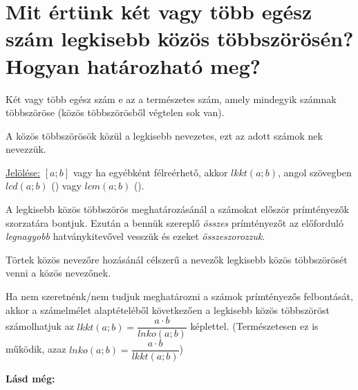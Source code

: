 
\section{Mit értünk két vagy több egész szám legkisebb közös többszörösén?
\texorpdfstring{\\}{}Hogyan határozható meg?}
\label{002}

\begin{defin}
Két vagy több egész szám e az a természetes szám, amely mindegyik számnak többszöröse (közös többszörösből végtelen sok van).
\end{defin}

\begin{defin}
A közös többszörösök közül a legkisebb nevezetes, ezt az adott számok nek nevezzük.

\uline{Jelölése:} $[a; b]$ vagy ha egyébként félreérhető, akkor $lkkt(a; b)$, angol szövegben $lcd(a; b)$ () vagy $lcm(a; b)$ ().
\end{defin}

\begin{method}
A legkisebb közös többszörös meghatározásánál a számokat először prímtényezők szorzatára bontjuk. Ezután a bennük szereplő \emph{összes} prímtényezőt az előforduló \emph{legnagyobb} hatványkitevővel vesszük és ezeket \emph{összeszorozzuk}.
\end{method}

\begin{note2}
Törtek közös nevezőre hozásánál célszerű a nevezők legkisebb közös többszörösét venni a közös nevezőnek.
\end{note2}

\begin{method2}
Ha nem szeretnénk/nem tudjuk meghatározni a számok prímtényezős felbontását, akkor a számelmélet alaptételéből következően a legkisebb közös többszöröst számolhatjuk az $lkkt(a; b) = \dfrac{a \cdot b}{lnko(a; b)}$ képlettel. (Természetesen ez  is működik, azaz $lnko(a; b) = \dfrac{a \cdot b}{lkkt(a; b)}$)
\end{method2}

\textbf{Lásd még:}
